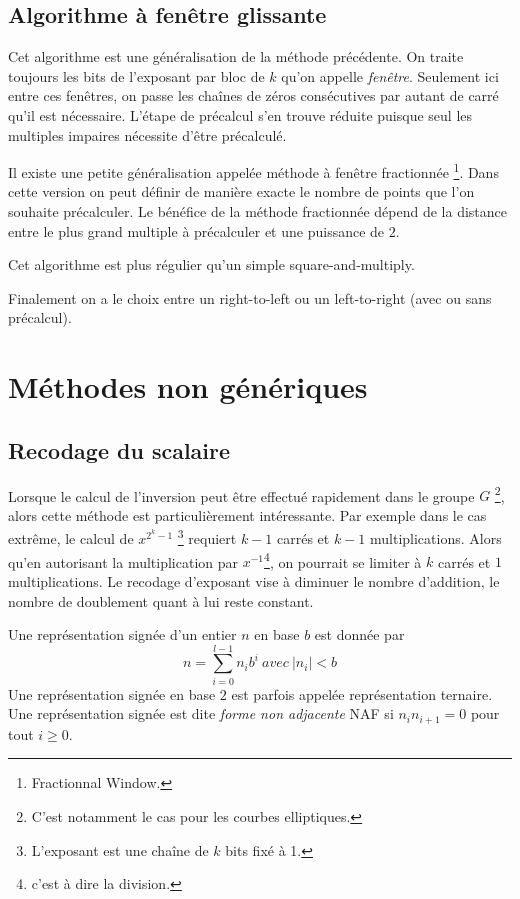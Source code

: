 
\subsection{Algorithme à fenêtre glissante}
Cet algorithme est une généralisation de la méthode précédente. On traite toujours les bits de l'exposant par bloc de $k$ qu'on appelle \emph{fenêtre}. Seulement ici entre ces fenêtres, on passe les chaînes de zéros consécutives par autant de carré qu'il est nécessaire. L'étape de précalcul s'en trouve réduite puisque seul les multiples impaires nécessite d'être précalculé.

Il existe une petite généralisation appelée méthode à fenêtre fractionnée \footnote{Fractionnal Window.}. Dans cette version on peut définir de manière exacte le nombre de points que l'on souhaite précalculer. Le bénéfice de la méthode fractionnée dépend de la distance entre le plus grand multiple à précalculer et une puissance de $2$.

Cet algorithme est plus régulier qu'un simple square-and-multiply.

Finalement on a le choix entre un right-to-left ou un left-to-right (avec ou sans précalcul).

\section{Méthodes non génériques}
\subsection{Recodage du scalaire}
Lorsque le calcul de l'inversion peut être effectué rapidement dans le groupe $G$ \footnote{C'est notamment le cas pour les courbes elliptiques.}, alors cette méthode est particulièrement intéressante. Par exemple dans le cas extrême, le calcul de $x^{2^k - 1}$ \footnote{L'exposant est une chaîne de $k$ bits fixé à 1.} requiert $k-1$ carrés et $k-1$ multiplications. Alors qu'en autorisant la multiplication par $x^{-1}$\footnote{c'est à dire la division.}, on pourrait se limiter à $k$ carrés et $1$ multiplications. Le recodage d'exposant vise à diminuer le nombre d'addition, le nombre de doublement quant à lui reste constant. 

\begin{definition}
Une représentation signée d'un entier $n$ en base $b$ est donnée par 
\begin{equation*}
n = \sum_{i = 0}^{l - 1} n_i b^i \ avec\ |n_i| < b
\end{equation*}
Une représentation signée en base $2$ est parfois appelée représentation ternaire. Une représentation signée est dite \emph{forme non adjacente} NAF si $n_in_{i+1} = 0$ pour tout $i \geq 0$. 
\end{definition}


